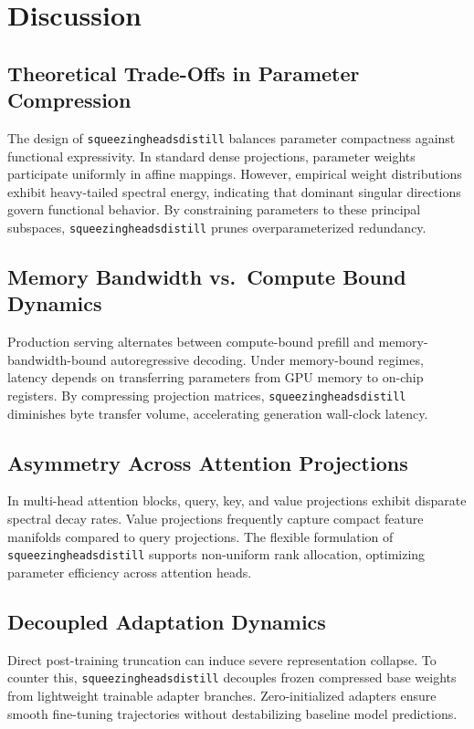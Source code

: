 \section{Discussion}

\subsection{Theoretical Trade-Offs in Parameter Compression}
The design of \texttt{squeezingheadsdistill} balances parameter compactness against functional expressivity. In standard dense projections, parameter weights participate uniformly in affine mappings. However, empirical weight distributions exhibit heavy-tailed spectral energy, indicating that dominant singular directions govern functional behavior. By constraining parameters to these principal subspaces, \texttt{squeezingheadsdistill} prunes overparameterized redundancy.

\subsection{Memory Bandwidth vs.\ Compute Bound Dynamics}
Production serving alternates between compute-bound prefill and memory-bandwidth-bound autoregressive decoding. Under memory-bound regimes, latency depends on transferring parameters from GPU memory to on-chip registers. By compressing projection matrices, \texttt{squeezingheadsdistill} diminishes byte transfer volume, accelerating generation wall-clock latency.

\subsection{Asymmetry Across Attention Projections}
In multi-head attention blocks, query, key, and value projections exhibit disparate spectral decay rates. Value projections frequently capture compact feature manifolds compared to query projections. The flexible formulation of \texttt{squeezingheadsdistill} supports non-uniform rank allocation, optimizing parameter efficiency across attention heads.

\subsection{Decoupled Adaptation Dynamics}
Direct post-training truncation can induce severe representation collapse. To counter this, \texttt{squeezingheadsdistill} decouples frozen compressed base weights from lightweight trainable adapter branches. Zero-initialized adapters ensure smooth fine-tuning trajectories without destabilizing baseline model predictions.

